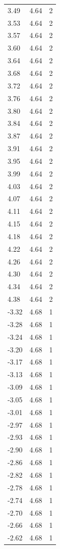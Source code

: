 \begin{longtable}{lrr}
  3.49 & 4.64 & 2 \\
  3.53 & 4.64 & 2 \\
  3.57 & 4.64 & 2 \\
  3.60 & 4.64 & 2 \\
  3.64 & 4.64 & 2 \\
  3.68 & 4.64 & 2 \\
  3.72 & 4.64 & 2 \\
  3.76 & 4.64 & 2 \\
  3.80 & 4.64 & 2 \\
  3.84 & 4.64 & 2 \\
  3.87 & 4.64 & 2 \\
  3.91 & 4.64 & 2 \\
  3.95 & 4.64 & 2 \\
  3.99 & 4.64 & 2 \\
  4.03 & 4.64 & 2 \\
  4.07 & 4.64 & 2 \\
  4.11 & 4.64 & 2 \\
  4.15 & 4.64 & 2 \\
  4.18 & 4.64 & 2 \\
  4.22 & 4.64 & 2 \\
  4.26 & 4.64 & 2 \\
  4.30 & 4.64 & 2 \\
  4.34 & 4.64 & 2 \\
  4.38 & 4.64 & 2 \\
  -3.32 & 4.68 & 1 \\
  -3.28 & 4.68 & 1 \\
  -3.24 & 4.68 & 1 \\
  -3.20 & 4.68 & 1 \\
  -3.17 & 4.68 & 1 \\
  -3.13 & 4.68 & 1 \\
  -3.09 & 4.68 & 1 \\
  -3.05 & 4.68 & 1 \\
  -3.01 & 4.68 & 1 \\
  -2.97 & 4.68 & 1 \\
  -2.93 & 4.68 & 1 \\
  -2.90 & 4.68 & 1 \\
  -2.86 & 4.68 & 1 \\
  -2.82 & 4.68 & 1 \\
  -2.78 & 4.68 & 1 \\
  -2.74 & 4.68 & 1 \\
  -2.70 & 4.68 & 1 \\
  -2.66 & 4.68 & 1 \\
  -2.62 & 4.68 & 1 \\

\end{longtable}
